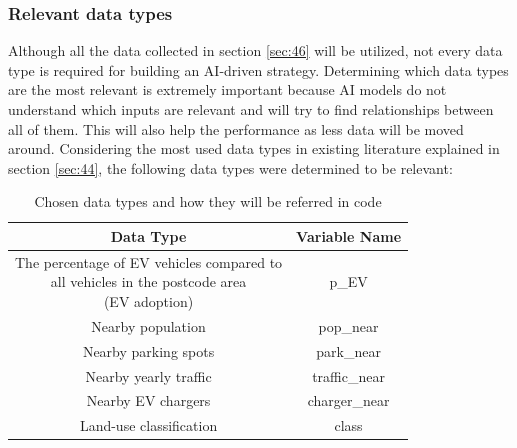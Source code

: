\subsubsection{Relevant data types}
Although all the data collected in section \ref{sec:46} will be utilized, not every data type is required for building an AI-driven strategy. Determining which data types are the most relevant is extremely important because AI models do not understand which inputs are relevant and will try to find relationships between all of them. This will also help the performance as less data will be moved around. Considering the most used data types in existing literature explained in section \ref{sec:44}, the following data types were determined to be relevant:

\begin{table}[H]
    \centering
    \begin{tabular}{|c|c|}
    \hline
        Data Type & Variable Name\\ \hline
        \makecell{The percentage of EV vehicles compared to\\  all vehicles in the postcode area\\ (EV adoption)}& p\_EV \\ \hline
         Nearby population & pop\_near\\ \hline
         Nearby parking spots & park\_near\\ \hline
         Nearby yearly traffic & traffic\_near\\ \hline
         Nearby EV chargers & charger\_near\\ \hline
         Land-use classification & class\\ \hline
    \end{tabular}
    \caption{Chosen data types and how they will be referred in code}
\end{table}
